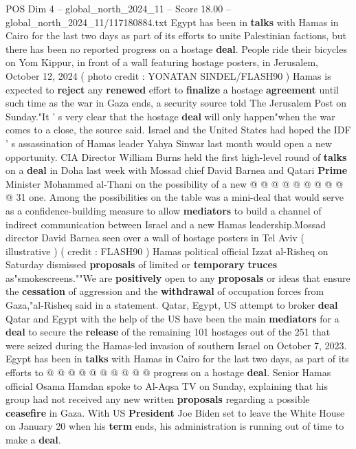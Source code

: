 \begin{textsample}{POS Dim 4 – global\_north\_2024\_11 – Score 18.00 – global\_north\_2024\_11/117180884.txt}  \label{ex:f4_pos_288}
Egypt has been in \textbf{talks} with Hamas in Cairo for the last two days as part of its efforts to unite Palestinian factions, but there has been no reported progress on a hostage \textbf{deal}.
People ride their bicycles on Yom Kippur, in front of a wall featuring hostage posters, in Jerusalem, October 12, 2024 ( photo credit : YONATAN SINDEL/FLASH90 ) Hamas is expected to \textbf{reject} any \textbf{renewed} effort to \textbf{finalize} a hostage \textbf{agreement} until such time as the war in Gaza ends, a security source told The Jerusalem Post on Sunday."It ' s very clear that the hostage \textbf{deal} will only happen"when the war comes to a close, the source said.
Israel and the United States had hoped the IDF ' s assassination of Hamas leader Yahya Sinwar last month would open a new opportunity.
CIA Director William Burns held the first high-level round of \textbf{talks} on a \textbf{deal} in Doha last week with Mossad chief David Barnea and Qatari \textbf{Prime} Minister Mohammed al-Thani on the possibility of a new @ @ @ @ @ @ @ @ @ @ 31 one.
Among the possibilities on the table was a mini-deal that would serve as a confidence-building measure to allow \textbf{mediators} to build a channel of indirect communication between Israel and a new Hamas leadership.Mossad director David Barnea seen over a wall of hostage posters in Tel Aviv ( illustrative ) ( credit : FLASH90 ) Hamas political official Izzat al-Risheq on Saturday dismissed \textbf{proposals} of limited or \textbf{temporary} \textbf{truces} as"smokescreens.""We are \textbf{positively} open to any \textbf{proposals} or ideas that ensure the \textbf{cessation} of aggression and the \textbf{withdrawal} of occupation forces from Gaza,"al-Risheq said in a statement.
Qatar, Egypt, US attempt to broker \textbf{deal} Qatar and Egypt with the help of the US have been the main \textbf{mediators} for a \textbf{deal} to secure the \textbf{release} of the remaining 101 hostages out of the 251 that were seized during the Hamas-led invasion of southern Israel on October 7, 2023.
Egypt has been in \textbf{talks} with Hamas in Cairo for the last two days, as part of its efforts to @ @ @ @ @ @ @ @ @ @ progress on a hostage \textbf{deal}.
Senior Hamas official Osama Hamdan spoke to Al-Aqsa TV on Sunday, explaining that his group had not received any new written \textbf{proposals} regarding a possible \textbf{ceasefire} in Gaza.
With US \textbf{President} Joe Biden set to leave the White House on January 20 when his \textbf{term} ends, his administration is running out of time to make a \textbf{deal}.

\end{textsample}
